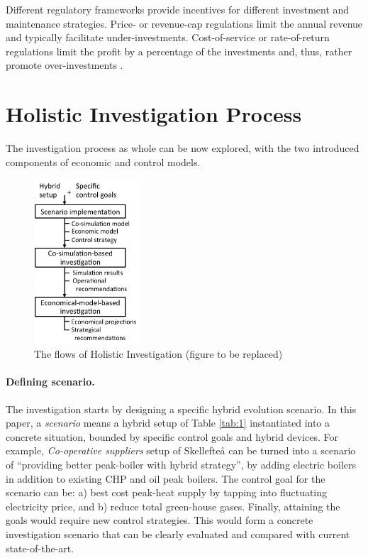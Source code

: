 \documentclass[review]{elsarticle}
\begin{document}
Different regulatory frameworks provide incentives for different
investment and maintenance strategies. Price- or revenue-cap
regulations limit the annual revenue and typically facilitate
under-investments. Cost-of-service or rate-of-return regulations limit
the profit by a percentage of the investments and, thus, rather
promote over-investments \cite{auer_2011}.

\section{Holistic Investigation Process}
\label{sec:holistic_investigation}

The investigation process as whole can be now explored, with the two
introduced components of economic and control models.

\begin{figure}[t]
  \centering
  \includegraphics[width=40mm]{figures/holistic_flow.pdf}
  \caption{The flows of Holistic Investigation (figure to be replaced)}
  \label{fig:flow}
\end{figure}


\paragraph{Defining scenario.} 
\noindent
The investigation starts by designing a specific hybrid evolution
scenario. In this paper, a {\em scenario} means a hybrid setup of Table
\ref{tab:1} instantiated into a concrete situation, bounded by
specific control goals and hybrid devices. For example, {\em 
  Co-operative suppliers} setup of Skellefte{\aa} can be turned into a 
scenario of ``providing better peak-boiler with hybrid strategy'', by
adding electric boilers in addition to existing CHP and oil peak
boilers. The control goal for the scenario can be: a) best cost
peak-heat supply by tapping into fluctuating electricity price, and b)
reduce total green-house gases. Finally, attaining the goals would
require new control strategies.  
This would form a concrete investigation scenario that can be clearly
evaluated and compared with current state-of-the-art.  
\end{document}
